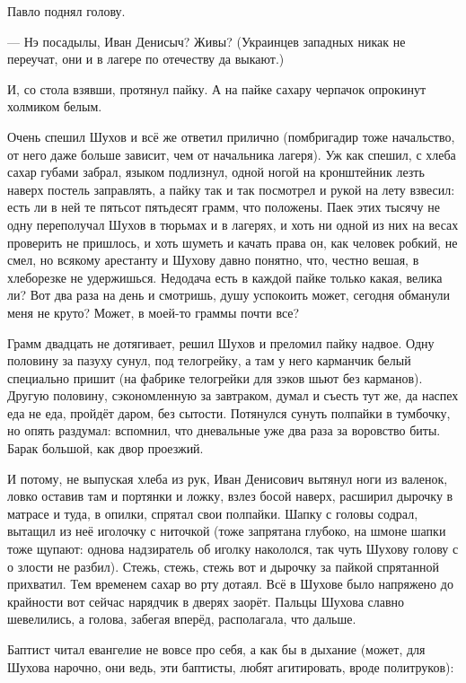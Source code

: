 Павло поднял голову.

--- Нэ посадылы, Иван Денисыч? Живы? \dash (Украинцев западных никак не переучат, они и в лагере по
отечеству да выкают.)

И, со стола взявши, протянул пайку. А на пайке \dash сахару черпачок опрокинут холмиком белым.

Очень спешил Шухов и всё же ответил прилично (помбригадир \dash тоже начальство, от него даже
больше зависит, чем от начальника лагеря). Уж как спешил, с хлеба сахар губами забрал, языком
подлизнул, одной ногой на кронштейник \dash лезть наверх постель заправлять, \dash а пайку так и так
посмотрел и рукой на лету взвесил: есть ли в ней те пятьсот пятьдесят грамм, что положены.
Паек этих тысячу не одну переполучал Шухов в тюрьмах и в лагерях, и хоть ни одной из них на
весах проверить не пришлось, и хоть шуметь и качать права он, как человек робкий, не смел, но
всякому арестанту и Шухову давно понятно, что, честно вешая, в хлеборезке не удержишься.
Недодача есть в каждой пайке \dash только какая, велика ли? Вот два раза на день и смотришь, душу
успокоить \dash может, сегодня обманули меня не круто? Может, в моей-то граммы почти все?

Грамм двадцать не дотягивает, \dash решил Шухов и преломил пайку надвое. Одну половину за пазуху
сунул, под телогрейку, а там у него карманчик белый специально пришит (на фабрике телогрейки
для зэков шьют без карманов). Другую половину, сэкономленную за завтраком, думал и съесть тут
же, да наспех еда не еда, пройдёт даром, без сытости. Потянулся сунуть полпайки в тумбочку, но
опять раздумал: вспомнил, что дневальные уже два раза за воровство биты. Барак большой, как
двор проезжий.

И потому, не выпуская хлеба из рук, Иван Денисович вытянул ноги из валенок, ловко оставив там
и портянки и ложку, взлез босой наверх, расширил дырочку в матрасе и туда, в опилки, спрятал
свои полпайки. Шапку с головы содрал, вытащил из неё иголочку с ниточкой (тоже запрятана
глубоко, на шмоне шапки тоже щупают: однова надзиратель об иголку накололся, так чуть Шухову
голову с о злости не разбил). Стежь, стежь, стежь \dash вот и дырочку за пайкой спрятанной
прихватил. Тем временем сахар во рту дотаял. Всё в Шухове было напряжено до крайности \dash вот
сейчас нарядчик в дверях заорёт. Пальцы Шухова славно шевелились, а голова, забегая вперёд,
располагала, что дальше.

Баптист читал евангелие не вовсе про себя, а как бы в дыхание (может, для Шухова нарочно, они
ведь, эти баптисты, любят агитировать, вроде политруков):

